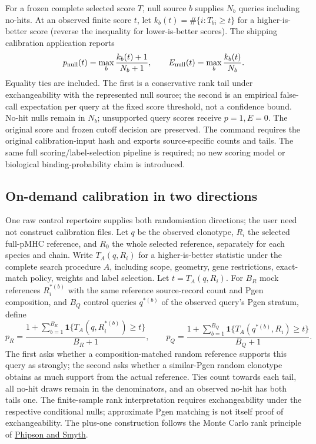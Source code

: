 \documentclass[10pt,a4paper]{article}
\theoremstyle{definition}
\begin{document}
For a frozen complete selected score $T$, null source $b$ supplies $N_b$
queries including no-hits. At an observed finite score $t$, let
$k_b(t)=\#\{i:T_{bi}\ge t\}$ for a higher-is-better score (reverse the
inequality for lower-is-better scores). The shipping calibration application reports
\[
 p_{\rm null}(t)=\max_b\frac{k_b(t)+1}{N_b+1},\qquad
 E_{\rm null}(t)=\max_b\frac{k_b(t)}{N_b}.
\]
Equality ties are included. The first is a conservative rank tail under
exchangeability with the represented null source; the second is an empirical
false-call expectation per query at the fixed score threshold, not a confidence
bound. No-hit nulls remain in $N_b$; unsupported query scores receive $p=1,E=0$.
The original score and frozen cutoff decision are preserved. The command requires
the original calibration-input hash and exports source-specific counts and tails.
The same full scoring/label-selection pipeline is required; no new scoring model
or biological binding-probability claim is introduced.

\subsection{On-demand calibration in two directions}\label{sec:directional}
One raw control repertoire supplies both randomisation directions; the user need not construct calibration files.
Let $q$ be the observed clonotype, $R_i$ the selected full-pMHC reference, and $R_0$ the whole selected reference, separately for each species and chain.
Write $T_A(q,R_i)$ for a higher-is-better statistic under the complete search procedure $A$, including scope, geometry, gene restrictions, exact-match policy, weights and label selection.
Let $t=T_A(q,R_i)$.
For $B_R$ mock references $R_i^{*(b)}$ with the same reference source-record count and Pgen composition, and $B_Q$ control queries $q^{*(b)}$ of the observed query's Pgen stratum, define
\[
 p_R=\frac{1+\sum_{b=1}^{B_R}\mathbf1\{T_A(q,R_i^{*(b)})\ge t\}}{B_R+1},
 \qquad
 p_Q=\frac{1+\sum_{b=1}^{B_Q}\mathbf1\{T_A(q^{*(b)},R_i)\ge t\}}{B_Q+1}.
\]
The first asks whether a composition-matched random reference supports this query as strongly; the second asks whether a similar-Pgen random clonotype obtains as much support from the actual reference.
Ties count towards each tail, all no-hit draws remain in the denominators, and an observed no-hit has both tails one.
The finite-sample rank interpretation requires exchangeability under the respective conditional nulls; approximate Pgen matching is not itself proof of exchangeability.
The plus-one construction follows the Monte Carlo rank principle of \href{https://doi.org/10.2202/1544-6115.1585}{Phipson and Smyth}.
\end{document}
